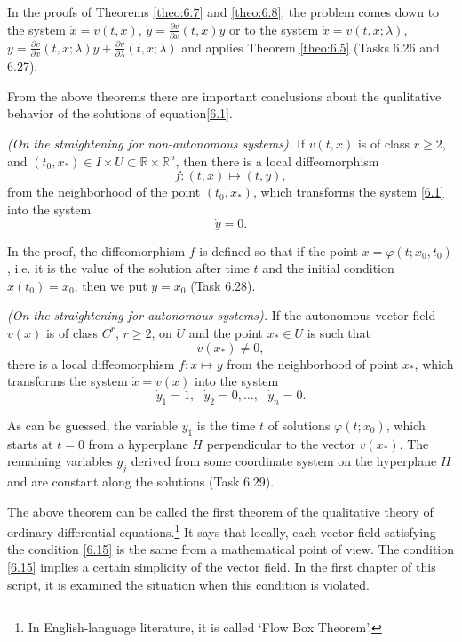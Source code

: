 In the proofs of Theorems \ref{theo:6.7} and \ref{theo:6.8}, the problem comes down to the system $\dot{x}=v(t,x)$, $\dot{y}=\frac{\partial v}{\partial x}(t,x)y$ or to the system $\dot{x}=v(t,x;\lambda )$, $\dot{y} = \frac{\partial v}{\partial x} (t,x;\lambda )y + \frac{\partial v} {\partial \lambda }(t,x;\lambda )$ and applies Theorem \ref{theo:6.5} (Tasks 6.26 and 6.27).

From the above theorems there are important conclusions about the qualitative behavior of the solutions of equation\eqref{6.1}.

\begin{theorem}\label{theo:6.9}
	\emph{(On the straightening for non-autonomous systems).}
	If $v (t, x)$ is of class $r\geq 2$, and $\left( t_{0},x_{\ast }\right) \in I\times U\subset \mathbb{R}\times \mathbb{R}^{n}$, then there is a local diffeomorphism
	$$
	f:(t,x)\longmapsto (t,y),
	$$
	from the neighborhood of the point $\left( t_{0},x_{\ast }\right)$, which transforms the system \eqref{6.1} into the system
	$$
	\dot{y}=0.
	$$
\end{theorem}

In the proof, the diffeomorphism $f$ is defined so that if the point $x=\varphi (t;x_{0},t_{0})$, i.e. it is the value of the solution after time $t$ and the initial condition $x(t_{0})=x_{0}$, then we put $y=x_{0}$ (Task 6.28).

\begin{theorem}\label{theo:6.10}
	\emph{(On the straightening for autonomous systems).}
	If the autonomous vector field $v (x)$ is of class $C^{r}$, $r \geq 2$, on $U$ and the point $x_{\ast
	}\in U$ is such that
	\begin{equation}
	\label{6.15}
	v(x_{\ast })\not=0,
	\end{equation}
	there is a local diffeomorphism $f:x\longmapsto y$ from the neighborhood of point $x_{\ast }$, which transforms the system $\dot{x}=v(x)$ into the system
	$$
	\dot{y}_{1}=1,\text{ }\dot{y}_{2}=0,\ldots ,\text{ }\dot{y}_{n}=0.
	$$
\end{theorem}

As can be guessed, the variable $y_1$ is the time $t$ of solutions $\varphi (t;x_{0})$, which starts at $t = 0$ from a hyperplane $H$ perpendicular to the vector $v (x_{\ast})$. The remaining variables $y_j$ derived from some coordinate system on the hyperplane $H$ and are constant along the solutions (Task 6.29).

\begin{remark}
	The above theorem can be called the first theorem of the qualitative theory of ordinary differential equations.\footnote{In English-language literature, it is called `Flow Box Theorem'.} It says that locally, each vector field satisfying the condition \eqref{6.15} is the same from a mathematical point of view. The condition \eqref{6.15} implies a certain simplicity of the vector field. In the first chapter of this script, it is examined the situation when this condition is violated.	
\end{remark}

